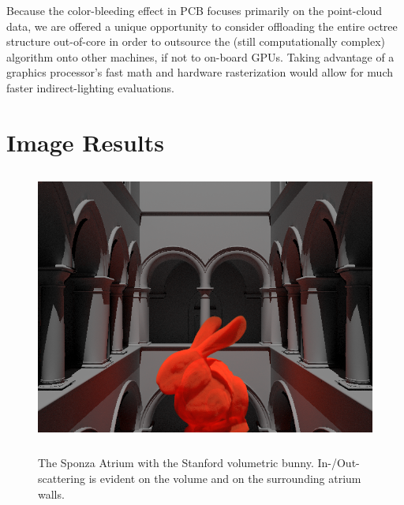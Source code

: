 \documentclass[12pt]{ucthesis}
\newcommand{\captionfonts}{\small\bf\ssp}
\begin{document}
\vspace{5mm}

Because the color-bleeding effect in PCB focuses primarily on the point-cloud data, we are offered a unique opportunity to consider offloading the entire octree structure out-of-core in order to outsource the (still computationally complex) algorithm onto other machines, if not to on-board GPUs.  Taking advantage of a graphics processor's fast math and hardware rasterization would allow for much faster indirect-lighting evaluations.


\clearpage






\section*{Image Results}

\begin{figure}[h!]
    \centering
    \includegraphics[height=90mm]{img/sponza.png}
    \captionfonts
    \caption{The Sponza Atrium with the Stanford volumetric bunny.  In-/Out-scattering is evident on the volume and on the surrounding atrium walls.}
\end{figure}
\end{document}
